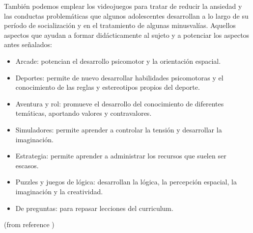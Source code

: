 \documentclass{bmcart}
\begin{document}
	También podemos emplear los videojuegos para tratar de reducir la ansiedad y las conductas problemáticas que algunos adolescentes desarrollan a lo largo de su período de socialización y en el tratamiento de algunas minusvalías.
	\newline
	\newline
	Aquellos aspectos que ayudan a formar didácticamente al sujeto y a potenciar los aspectos antes señalados:
		\begin{itemize}
			\item Arcade: potencian el desarrollo psicomotor y la orientación espacial.
			\item Deportes: permite de nuevo desarrollar habilidades psicomotoras y el conocimiento de las reglas y estereotipos propios del deporte.
			\item Aventura y rol: promueve el desarrollo del conocimiento de diferentes temáticas, aportando valores y contravalores.
			\item Simuladores: permite aprender a controlar la tensión y desarrollar la imaginación.
			\item Estrategia: permite aprender a administrar los recursos que suelen ser escasos.
			\item Puzzles y juegos de lógica: desarrollan la lógica, la percepción espacial, la imaginación y la creatividad.
			\item De preguntas: para repasar lecciones del curriculum.
		\end{itemize}
	(from reference \cite{diaz2005videojuegos})
\end{document}
